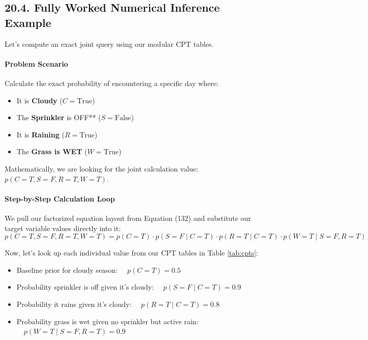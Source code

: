 \documentclass{article}
\begin{document}
\subsection*{20.4. Fully Worked Numerical Inference Example}

Let's compute an exact joint query using our modular CPT tables.

\paragraph{Problem Scenario}
Calculate the exact probability of encountering a specific day where:
\begin{itemize}
    \item It is \textbf{Cloudy} ($C = \text{True}$)
    \item The \textbf{Sprinkler} is OFF** ($S = \text{False}$)
    \item It is \textbf{Raining} ($R = \text{True}$)
    \item The \textbf{Grass is WET} ($W = \text{True}$)
\end{itemize}
Mathematically, we are looking for the joint calculation value: $p(C=T, S=F, R=T, W=T)$.

\paragraph{Step-by-Step Calculation Loop}
We pull our factorized equation layout from Equation (132) and substitute our target variable values directly into it:
\begin{equation}
p(C=T, S=F, R=T, W=T) = p(C=T) \cdot p(S=F \mid C=T) \cdot p(R=T \mid C=T) \cdot p(W=T \mid S=F, R=T) \tag{133}
\end{equation}

Now, let's look up each individual value from our CPT tables in Table \ref{tab:cpts}:
\begin{itemize}
    \item Baseline prior for cloudy season: $\quad p(C=T) = \mathbf{0.5}$
    \item Probability sprinkler is off given it's cloudy: $\quad p(S=F \mid C=T) = \mathbf{0.9}$
    \item Probability it rains given it's cloudy: $\quad p(R=T \mid C=T) = \mathbf{0.8}$
    \item Probability grass is wet given no sprinkler but active rain: $\quad p(W=T \mid S=F, R=T) = \mathbf{0.9}$
\end{itemize}
\end{document}
